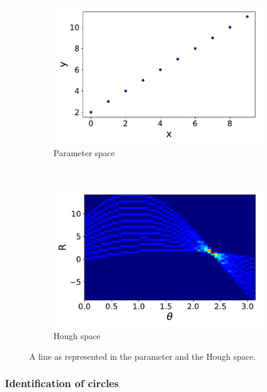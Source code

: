 \begin{figure}[ht]
	\centering
	\begin{subfigure}[b]{0.45\textwidth}
        \includegraphics[width=\textwidth]{figures/line.pdf}
        \caption{Parameter space}
    \end{subfigure}
		~ %
		\begin{subfigure}[b]{0.45\textwidth}
					\includegraphics[width=\textwidth]{figures/line_hough.pdf}
					\caption{Hough space}
			\end{subfigure}

	\caption{A line as represented in the parameter and the Hough space.}
	\label{HTLine}
\end{figure}

\subsubsection{Identification of circles}


